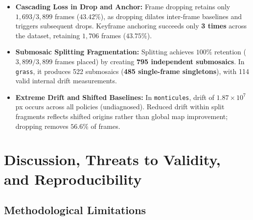 \documentclass[conference]{IEEEtran}
\begin{document}
\begin{itemize}\setlength{\itemsep}{1.5pt}\setlength{\parskip}{0pt}
    \item \textbf{Cascading Loss in Drop and Anchor:} Frame dropping retains only $1{,}693 / 3{,}899$ frames ($43.42\%$), as dropping dilates inter-frame baselines and triggers subsequent drops. Keyframe anchoring succeeds only \textbf{3 times} across the dataset, retaining $1{,}706$ frames ($43.75\%$).
    \item \textbf{Submosaic Splitting Fragmentation:} Splitting achieves $100\%$ retention ($3{,}899 / 3{,}899$ frames placed) by creating \textbf{795 independent submosaics}. In \texttt{grass}, it produces 522 submosaics (\textbf{485 single-frame singletons}), with 114 valid internal drift measurements.
    \item \textbf{Extreme Drift and Shifted Baselines:} In \texttt{monticules}, drift of $1.87 \times 10^7$\,px occurs across all policies (undiagnosed). Reduced drift within split fragments reflects shifted origins rather than global map improvement; dropping removes $56.6\%$ of frames.
\end{itemize}

\section{Discussion, Threats to Validity, and Reproducibility}
\label{sec:discussion}

\subsection{Methodological Limitations}
\label{subsec:validity}
\end{document}
